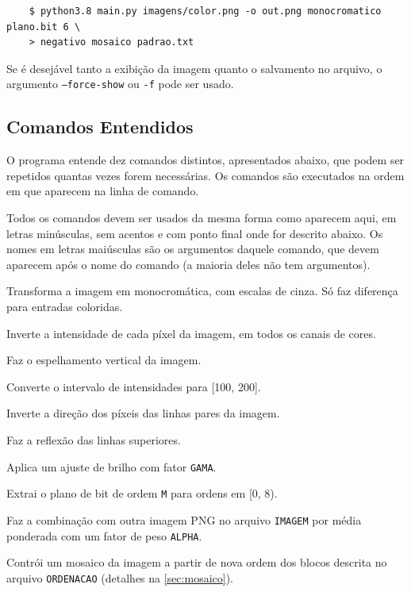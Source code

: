\begin{verbatim}
    $ python3.8 main.py imagens/color.png -o out.png monocromatico plano.bit 6 \
    > negativo mosaico padrao.txt
\end{verbatim}

Se é desejável tanto a exibição da imagem quanto o salvamento no arquivo, o argumento \texttt{--force-show} ou \texttt{-f} pode ser usado.

\subsection{Comandos Entendidos}

O programa entende dez comandos distintos, apresentados abaixo, que podem ser repetidos quantas vezes forem necessárias. Os comandos são executados na ordem em que aparecem na linha de comando.

Todos os comandos devem ser usados da mesma forma como aparecem aqui, em letras minúsculas, sem acentos e com ponto final onde for descrito abaixo. Os nomes em letras maiúsculas são os argumentos daquele comando, que devem aparecem após o nome do comando (a maioria deles não tem argumentos).

\begin{description}[labelwidth=\widthof{\texttt{combina IMAGEM ALPHA}}, leftmargin=!, itemsep=1.5em]
    \item[\texttt{monocromatico}] Transforma a imagem em monocromática, com escalas de cinza. Só faz diferença para entradas coloridas.

    \item[\texttt{negativo}] Inverte a intensidade de cada píxel da imagem, em todos os canais de cores.

    \item[\texttt{esp.verical}] Faz o espelhamento vertical da imagem.

    \item[\texttt{conv.intervalo}] Converte o intervalo de intensidades para [100, 200].

    \item[\texttt{inverte.pares}] Inverte a direção dos píxeis das linhas pares da imagem.

    \item[\texttt{reflexao}] Faz a reflexão das linhas superiores.

    \item[\texttt{aj.brilho GAMA}] Aplica um ajuste de brilho com fator \texttt{GAMA}.

    \item[\texttt{plano.bit M}] Extrai o plano de bit de ordem \texttt{M} para ordens em [0, 8).

    \item[\texttt{combina IMAGEM ALPHA}] Faz a combinação com outra imagem PNG no arquivo \texttt{IMAGEM} por média ponderada com um fator de peso \texttt{ALPHA}.

    \item[\texttt{mosaico ORDENACAO}] Contrói um mosaico da imagem a partir de nova ordem dos blocos descrita no arquivo \texttt{ORDENACAO} (detalhes na \cref{sec:mosaico}).
\end{description}

